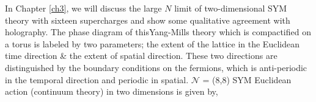 In Chapter \ref{ch3}, we will discuss the large $N$ limit of two-dimensional SYM theory with sixteen supercharges 
and show some qualitative agreement with holography. 
The phase diagram of thisYang-Mills theory which is compactified on a torus is labeled by two parameters; 
the extent of the lattice in the Euclidean time direction \& the extent of spatial direction. These two 
directions are distinguished by the boundary conditions on the fermions, which is anti-periodic in the
temporal direction and periodic in spatial. 
$\mathcal{N}$ = (8,8) SYM Euclidean action (continuum theory) in two dimensions is given by, 


